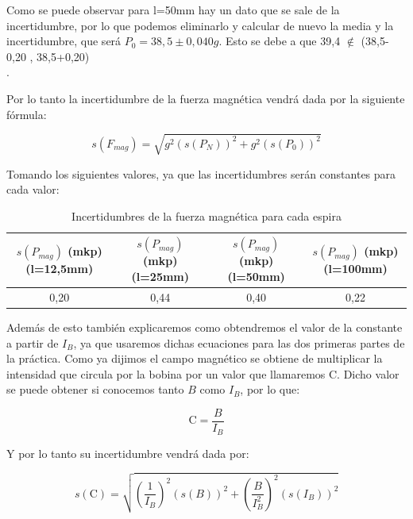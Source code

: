 \documentclass[12pt,a4paper]{book}
\begin{document}
\vspace*{0.5cm}


Como se puede observar para l=50mm hay un dato que se sale de la incertidumbre, por lo que podemos eliminarlo y calcular de nuevo la media y la incertidumbre, que será $P_0=38,5 \pm 0,040 g$. Esto se debe a que 39,4 $\notin$ (38,5-0,20 , 38,5+0,20) \\.

Por lo tanto la incertidumbre de la fuerza magnética vendrá dada por la siguiente fórmula:

\begin{equation}
s(F_{mag})=\sqrt{g^2(s(P_N))^2+g^2(s(P_0))^2}
\label{Ec:balanza incertidumbre de la fuerza magnetica balanza electrodinamica}
\end{equation}

\vspace*{0.10cm}


Tomando los siguientes valores, ya que las incertidumbres serán constantes para cada valor:

\begin{table}[h!]
\begin{center}
\begin{tabular}{|c|c|c|c|}
\hline
$s(P_{mag}) $ (mkp) (l=12,5mm) & $s(P_{mag})$ (mkp) (l=25mm) & $s(P_{mag})$ (mkp) (l=50mm) & $s(P_{mag})$ (mkp) (l=100mm) \\ \hline
0,20 & 0,44 & 0,40 & 0,22 
\\ \hline
\end{tabular}
\end{center}
\caption{Incertidumbres de la fuerza magnética para cada espira}
\end{table}

Además de esto también explicaremos como obtendremos el valor de la constante a partir de $I_B$, ya que usaremos dichas ecuaciones para las dos primeras partes de la práctica. Como ya dijimos el campo magnético se obtiene de multiplicar la intensidad que circula por la bobina por un valor que llamaremos C. Dicho valor se puede obtener si conocemos tanto $B$ como $I_B$, por lo que:


\begin{equation}
\mathrm{C}=\dfrac{B}{I_B}
\label{Ec:balanza Valor de la constante Balanza electrodinamica}
\end{equation}

Y por lo tanto su incertidumbre vendrá dada por:

\begin{equation}
s(\mathrm{C})=\sqrt{(\dfrac{1}{I_B})^2(s(B))^2+(\dfrac{B}{I_B^2})^2(s(I_B))^2}
\label{Ec:balanza valor de la constante Balanza electrodinamica incertidumbre}
\end{equation}
\end{document}
